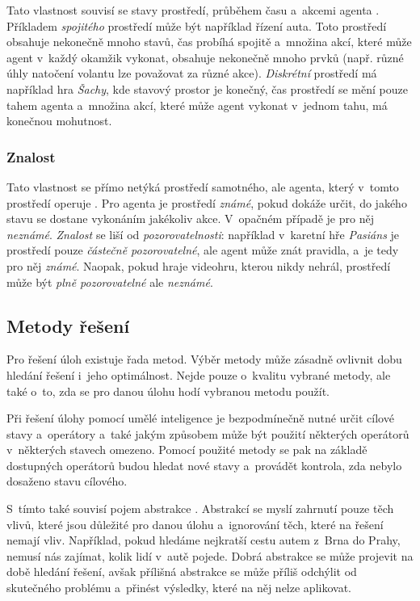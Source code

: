 Tato vlastnost souvisí se stavy prostředí, průběhem času a~akcemi agenta \cite{AI_Russel_Norvig}. Příkladem \emph{spojitého} prostředí může být například řízení auta. Toto prostředí obsahuje nekonečně mnoho stavů, čas probíhá spojitě a~množina akcí, které může agent v~každý okamžik vykonat, obsahuje nekonečně mnoho prvků (např. různé úhly natočení volantu lze považovat za různé akce). \emph{Diskrétní} prostředí má například hra \emph{Šachy}, kde stavový prostor je konečný, čas prostředí se mění pouze tahem agenta a~množina akcí, které může agent vykonat v~jednom tahu, má konečnou mohutnost.

\subsubsection*{Znalost}

Tato vlastnost se přímo netýká prostředí samotného, ale agenta, který v~tomto prostředí operuje \cite{AI_Russel_Norvig}. Pro agenta je prostředí \emph{známé}, pokud dokáže určit, do jakého stavu se dostane vykonáním jakékoliv akce. V~opačném případě je pro něj \emph{neznámé}. \emph{Znalost} se liší od \emph{pozorovatelnosti}: například v~karetní hře \emph{Pasiáns} je prostředí pouze \emph{částečně pozorovatelné}, ale agent může znát pravidla, a~je tedy pro něj \emph{známé}. Naopak, pokud hraje videohru, kterou nikdy nehrál, prostředí může být \emph{plně pozorovatelné} ale \emph{neznámé}.

\subsection*{Metody řešení}

Pro řešení úloh existuje řada metod. Výběr metody může zásadně ovlivnit dobu hledání řešení i~jeho optimálnost. Nejde pouze o~kvalitu vybrané metody, ale také o~to, zda se pro danou úlohu hodí vybranou metodu použít.

Při řešení úlohy pomocí umělé inteligence je bezpodmínečně nutné určit cílové stavy a~operátory a~také jakým způsobem může být použití některých operátorů v~některých stavech omezeno. Pomocí použité metody se pak na základě dostupných operátorů budou hledat nové stavy a~provádět kontrola, zda nebylo dosaženo stavu cílového.

S~tímto také souvisí pojem abstrakce \cite{AI_Russel_Norvig}. Abstrakcí se myslí zahrnutí pouze těch vlivů, které jsou důležité pro danou úlohu a~ignorování těch, které na řešení nemají vliv. Například, pokud hledáme nejkratší cestu autem z~Brna do Prahy, nemusí nás zajímat, kolik lidí v~autě pojede. Dobrá abstrakce se může projevit na době hledání řešení, avšak přílišná abstrakce se může příliš odchýlit od skutečného problému a~přinést výsledky, které na něj nelze aplikovat.

